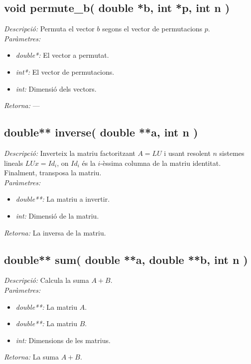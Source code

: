 \documentclass[a4paper,10pt, notitlepage]{article}
\begin{document}
\subsection{void permute\_b( double *b, int *p, int n )}
\textit{Descripció: }
  Permuta el vector $b$ segons el vector de permutacions $p$.
\\\textit{Paràmetres: }\begin{itemize}[label={--}]
  \item \textit{double*: } El vector a permutat.
  \item \textit{int*: } El vector de permutacions.
  \item \textit{int: } Dimensió dels vectors.
\end{itemize}
\textit{Retorna: } ---



\subsection{double** inverse( double **a, int n )}
\textit{Descripció: }
  Inverteix la matriu factoritzant $A=LU$ i usant resolent $n$ sistemes lineals $LUx=Id_i$, on $Id_i$ és la $i$-èssima columna de la matriu identitat. Finalment, transposa la matriu.
\\\textit{Paràmetres: }\begin{itemize}[label={--}]
  \item \textit{double**: } La matriu a invertir.
  \item \textit{int: } Dimensió de la matriu.
\end{itemize}
\textit{Retorna: } La inversa de la matriu.



\subsection{double** sum( double **a, double **b, int n )}
\textit{Descripció: }
  Calcula la suma $A+B$.
\\\textit{Paràmetres: }\begin{itemize}[label={--}]
  \item \textit{double**: } La matriu $A$.
  \item \textit{double**: } La matriu $B$.
  \item \textit{int: } Dimensions de les matrius.
\end{itemize}
\textit{Retorna: } La suma $A+B$.
\end{document}
